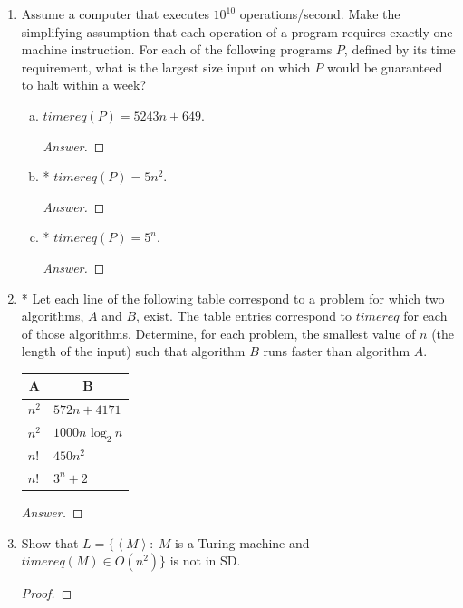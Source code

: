 \documentclass[10pt]{article}
\newcommand{\brackets}[1]{\left< #1 \right>}
\begin{document}
\begin{enumerate}[1)]

\item
Assume a computer that executes $10^{10}$ operations/second.  Make the simplifying assumption that each operation of a program requires exactly one machine instruction.  For each of the following programs $P$, defined by its time requirement, what is the largest size input on which $P$ would be guaranteed to halt within a week?
\begin{enumerate}[a)]
\item
$timereq(P) = 5243n+649$.
\begin{proof}[Answer]
\end{proof}
\item
* $timereq(P) = 5n^2$.
\begin{proof}[Answer]
\end{proof}
\item
* $timereq(P) = 5^n$.
\begin{proof}[Answer]
\end{proof}
\end{enumerate}



\item
* Let each line of the following table correspond to a problem for which two algorithms, $A$ and $B$, exist.  The table entries correspond to $timereq$ for each of those algorithms.  Determine, for each problem, the smallest value of $n$ (the length of the input) such that algorithm $B$ runs faster than algorithm $A$.
\begin{center}
\begin{tabular}{| p{3cm} | p{3cm} |}
  \hline
  \multicolumn{1}{|c}{A}&
  \multicolumn{1}{|c|}{B}\\
  \hline
  $n^2$&$572n + 4171$\\
  \hline
  $n^2$&$1000n\textrm{ log}_2\ n$\\
  \hline
  $n!$&$450n^2$\\
  \hline
  $n!$&$3^n + 2$\\
  \hline
\end{tabular}
\end{center}
\begin{proof}[Answer]
\end{proof}


\item
Show that $L = \{\brackets{M}:\ M$ is a Turing machine and $timereq(M) \in O(n^2)\}$ is not in SD.
\begin{proof}[Proof]
\end{proof}


\end{enumerate}
\end{document}

